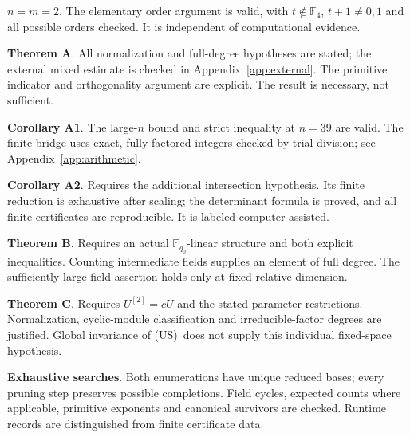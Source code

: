 \documentclass[11pt,a4paper]{article}
\theoremstyle{definition}\newtheorem{definition}[theorem]{Definition}
\theoremstyle{remark}\newtheorem{remark}[theorem]{Remark}
\newcommand{\F}{\mathbb F}
\newcommand{\US}{\textup{(US)}}
\numberwithin{equation}{section}
\begin{document}
\begin{samepage}
\textbf{$n=m=2$}. The elementary order argument is valid, with $t\notin\F_4$, $t+1\ne0,1$ and all possible orders checked. It is independent of computational evidence.
\end{samepage}

\begin{samepage}
\textbf{Theorem A}. All normalization and full-degree hypotheses are stated; the external mixed estimate is checked in Appendix~\ref{app:external}. The primitive indicator and orthogonality argument are explicit. The result is necessary, not sufficient.
\end{samepage}

\begin{samepage}
\textbf{Corollary A1}. The large-$n$ bound and strict inequality at $n=39$ are valid. The finite bridge uses exact, fully factored integers checked by trial division; see Appendix~\ref{app:arithmetic}.
\end{samepage}

\begin{samepage}
\textbf{Corollary A2}. Requires the additional intersection hypothesis. Its finite reduction is exhaustive after scaling; the determinant formula is proved, and all finite certificates are reproducible. It is labeled computer-assisted.
\end{samepage}

\begin{samepage}
\textbf{Theorem B}. Requires an actual $\F_{q_0}$-linear structure and both explicit inequalities. Counting intermediate fields supplies an element of full degree. The sufficiently-large-field assertion holds only at fixed relative dimension.
\end{samepage}

\begin{samepage}
\textbf{Theorem C}. Requires $U^{[2]}=cU$ and the stated parameter restrictions. Normalization, cyclic-module classification and irreducible-factor degrees are justified. Global invariance of \US\ does not supply this individual fixed-space hypothesis.
\end{samepage}

\begin{samepage}
\textbf{Exhaustive searches}. Both enumerations have unique reduced bases; every pruning step preserves possible completions. Field cycles, expected counts where applicable, primitive exponents and canonical survivors are checked. Runtime records are distinguished from finite certificate data.
\end{samepage}
\end{document}
